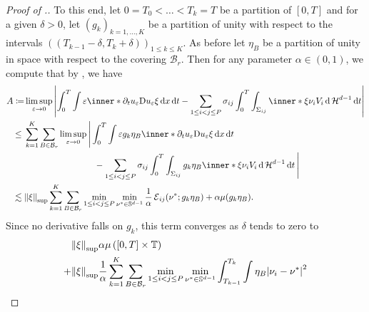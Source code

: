 \begin{proof}[Proof of .]
	To this end, let $ 0 = T_{ 0 } < \dotsc < T_{ k } = T $ be a partition of $ 
	[ 0 , T ] $ and for a given $ \delta > 0 $, let $ ( g_{ k } )_{ k = 1 , 
		\dotsc, K } $ be a partition of unity with respect to the intervals 
	$ \left( ( T_{ k - 1 } - \delta , T_{ k } + \delta ) \right)_{ 1 \leq k 
	\leq K } $. As before 
	let $ \eta_{ B } $ be a partition of unity in space with respect to the 
	covering $ \mathcal{ B }_{ r } $. 
	Then for any parameter $ \alpha \in ( 0 , 
	1 ) $, we compute that by , we have
	\begin{align*}
		A \coloneqq&
		\limsup_{ \varepsilon \to 0 }
		\abs{
			\int_{ 0 }^{ T }
			\int
			\varepsilon
			\inner*{ \partial_{ t } 
				u_{ \varepsilon } }{ \diff u_{ \varepsilon } \xi }
			\dd{ x }
			\dd{ t }
			-
			\sum_{ 1 \leq i < j \leq P }
			\sigma_{ i j }
			\int_{ 0 }^{ T }
			\int_{ \Sigma_{ i j } }
			\inner*{ \xi }{ \nu_{ i } }
			V_{ i }
			\dd{ \hm^{ d -1 } }
			\dd{ t }
		}
		\\
		\leq{} &
		\sum_{ k = 1 }^{ K }
		\sum_{ B \in \mathcal{ B }_{ r } }
		\limsup_{ \varepsilon \to 0 }
		\Bigg{|}
		\int_{ 0 }^{ T }
		\int
		\varepsilon
		g_{ k } \eta_{ B }
		\inner*{ 
			\partial_{ t } u_{ \varepsilon } }{ \diff 
			u_{ \varepsilon } \xi }
		\dd{ x }
		\dd{ t }
		\\
		& \qquad \qquad \qquad \qquad-
		\sum_{ 1 \leq i < j \leq P }
		\sigma_{ i j }
		\int_{ 0 }^{ T }
		\int_{ \Sigma_{ i j } }
		g_{ k } \eta_{ B }
		\inner*{\xi }{ \nu_{ i } }
		V_{ i }
		\dd{ \hm^{ d - 1 } }
		\dd{ t }					
		\Bigg{|}
		\\
		\lesssim{} &
		\norm{ \xi }_{ \mathrm{sup} }
		\sum_{ k = 1 }^{ K }
		\sum_{ B \in \mathcal{ B }_{ r } }
		\min_{ 1\leq i < j \leq P }
		\min_{ \nu^{ \ast } \in \mathbb{ S }^{ d - 1 } }
		\frac{ 1 }{ \alpha }
		\tilt_excess_{ i j } ( \nu^{ \ast } ; g_{ k } \eta_{ 
			B } )
		+
		\alpha \mu ( g_{ k } \eta_{ B } ).
	\end{align*}
	Since no derivative falls on $ g_{ k } $, this term converges as $ \delta $ 
	tends to zero to
	\begin{align}
		& \notag
		\norm{ \xi }_{ \mathrm{sup} }
		\alpha \mu \left( [ 0 , T ] \times \flattorus \right)
		\\
		+{} &
		\norm{ \xi }_{ \mathrm{sup} }
		\frac{ 1 }{ \alpha }
		\sum_{ k = 1 }^{ K }
		\sum_{ B \in \mathcal{ B }_{ r } }
		\min_{ 1 \leq i < j \leq P}
		\min_{ \nu^{ \ast } \in \mathbb{ S }^{ d - 1 } }
		\int_{ T_{ k - 1 } }^{ T_{ k } }
		\int
		\eta_{ B } 
		\abs{ \nu_{ i } - \nu^{ \ast } }^{ 2 }

\end{align}
\end{proof}
